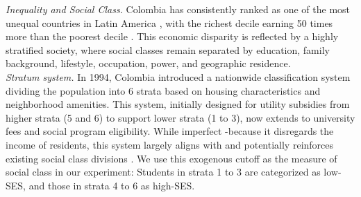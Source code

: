 \documentclass[11pt,a4paper,oneside]{article}
\begin{document}
\textit{Inequality and Social Class.} Colombia has consistently ranked as one of the most unequal countries in Latin America \citep{barretoherrera2024regional}, with the richest decile earning 50 times more than the poorest decile \citep{comisioneconomicaparaamericalatinayel2023}. This economic disparity is reflected by a highly stratified society, where social classes remain separated by education, family background, lifestyle, occupation, power, and geographic residence. \medskip \\
\textit{Stratum system.} In 1994, Colombia introduced a nationwide classification system dividing the population into 6 strata based on housing characteristics and neighborhood amenities. This system, initially designed for utility subsidies from higher strata (5 and 6) to support lower strata (1 to 3), now extends to university fees and social program eligibility. While imperfect -because it disregards the income of residents, this system largely aligns with and potentially reinforces existing social class divisions \citep{uribe2008estratificacion, guevara2019spatializing}. We use this exogenous cutoff as the measure of social class in our experiment: Students in strata 1 to 3 are categorized as low-SES, and those in strata 4 to 6 as high-SES.  \medskip \\
\end{document}
